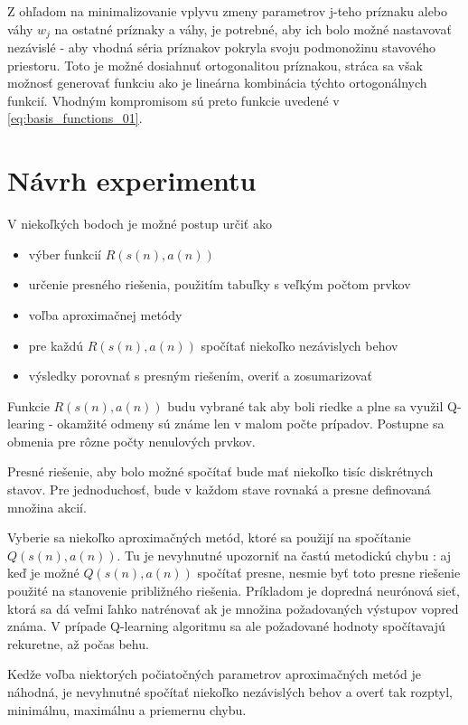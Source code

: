Z ohľadom na minimalizovanie vplyvu zmeny parametrov j-teho príznaku alebo váhy $w_j$
na ostatné príznaky a váhy, je potrebné, aby ich bolo možné nastavovať nezávislé -
aby vhodná séria príznakov pokryla svoju podmonožinu stavového priestoru. Toto
je možné dosiahnuť ortogonalitou príznakou, stráca sa však možnosť generovať funkciu
ako je lineárna kombinácia týchto ortogonálnych funkcií. Vhodným kompromisom sú
preto funkcie uvedené v \ref{eq:basis_functions_01}.


\section {Návrh experimentu}

V niekoľkých bodoch je možné postup určiť ako

\begin{itemize}
\item výber funkcií $R(s(n), a(n))$
\item určenie presného riešenia, použitím tabuľky s veľkým počtom prvkov
\item voľba aproximačnej metódy
\item pre každú $R(s(n), a(n))$ spočítať niekoľko nezávislych behov
\item výsledky porovnať s presným riešením, overiť a zosumarizovať
\end{itemize}

Funkcie $R(s(n), a(n))$ budu vybrané tak aby boli riedke a plne sa využil Q-learing -
okamžité odmeny sú známe len v malom počte prípadov.
Postupne sa obmenia pre rôzne počty nenulových prvkov.

Presné riešenie, aby bolo možné spočítať bude mať niekoľko tisíc diskrétnych stavov.
Pre jednoduchosť, bude v každom stave rovnaká a presne definovaná množina akcií.

Vyberie sa niekoľko aproximačných metód, ktoré sa použijí na spočítanie $Q(s(n), a(n))$.
Tu je nevyhnutné upozorniť na častú metodickú chybu : aj keď je možné $Q(s(n), a(n))$
spočítať presne, nesmie byť toto presne riešenie použité na stanovenie približného riešenia.
Príkladom je dopredná neurónová sieť, ktorá sa dá veľmi ľahko natrénovať ak je množina požadovaných
výstupov vopred známa. V prípade Q-learning algoritmu sa ale požadované hodnoty spočítavajú
rekuretne, až počas behu.

Kedže voľba niektorých počiatočných parametrov aproximačných metód je náhodná,
je nevyhnutné spočítať niekoľko nezávislých behov a overť tak rozptyl, minimálnu, maximálnu
a priemernu chybu.



